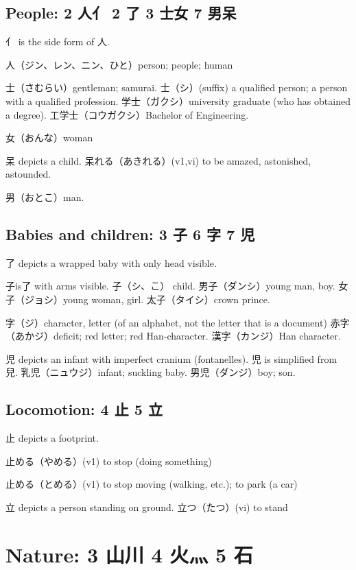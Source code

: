 \subsection{People: 2 人亻 2 了 3 士女 7 男呆}

亻 is the side form of 人.

人（ジン、レン、ニン、ひと）person; people; human

士（さむらい）gentleman; samurai.
士（シ）(suffix)
a qualified person;
a person with a qualified profession.
学士（ガクシ）university graduate (who has obtained a degree).
工学士（コウガクシ）Bachelor of Engineering.

女（おんな）woman

呆 depicts a child.
呆れる（あきれる）(v1,vi) to be amazed, astonished, astounded.

男（おとこ）man.

\subsection{Babies and children: 3 子 6 字 7 児}

了 depicts a wrapped baby with only head visible.

子is了 with arms visible.
子（シ、こ） child.
男子（ダンシ）young man, boy.
女子（ジョシ）young woman, girl.
太子（タイシ）crown prince.

字（ジ）character, letter (of an alphabet, not the letter that is a document)
赤字（あかジ）deficit; red letter; red Han-character.
漢字（カンジ）Han character.

児 depicts an infant with imperfect cranium (fontanelles).
児 is simplified from 兒.
乳児（ニュウジ）infant; suckling baby.
男児（ダンジ）boy; son.

\subsection{Locomotion: 4 止 5 立}

止 depicts a footprint.

止める（やめる）(v1) to stop (doing something)

止める（とめる）(v1) to stop moving (walking, etc.); to park (a car)

立 depicts a person standing on ground.
立つ（たつ）(vi) to stand

\section{Nature: 3 山川 4 火灬 5 石}

